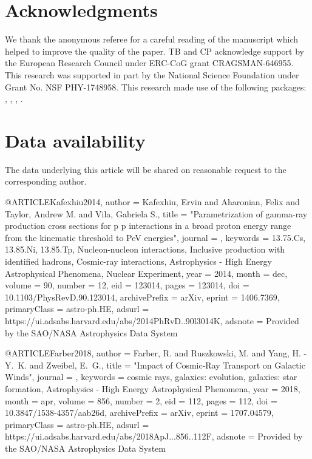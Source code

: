 \documentclass[useAMS,usenatbib]{mnras}
\begin{document}
\section*{Acknowledgments}
We thank the anonymous referee for a careful reading of the manuscript which helped to improve the quality of the paper. TB and CP acknowledge support by the European Research Council under ERC-CoG grant CRAGSMAN-646955. This research was supported in part by the National Science Foundation under Grant No. NSF PHY-1748958. This research made use of the following {} packages: {} \citep{matplotlib}, {} \citep{scipy}, {} \citep{numpy},  {} \citep{ipython,jupyter}.

\section*{Data availability}
The data underlying this article will be shared on reasonable request to the corresponding author.





@ARTICLE{Kafexhiu2014,
       author = {{Kafexhiu}, Ervin and {Aharonian}, Felix and {Taylor}, Andrew M. and
         {Vila}, Gabriela S.},
        title = "{Parametrization of gamma-ray production cross sections for p p interactions in a broad proton energy range from the kinematic threshold to PeV energies}",
      journal = {\prd},
     keywords = {13.75.Cs, 13.85.Ni, 13.85.Tp, Nucleon-nucleon interactions, Inclusive production with identified hadrons, Cosmic-ray interactions, Astrophysics - High Energy Astrophysical Phenomena, Nuclear Experiment},
         year = 2014,
        month = dec,
       volume = {90},
       number = {12},
          eid = {123014},
        pages = {123014},
          doi = {10.1103/PhysRevD.90.123014},
archivePrefix = {arXiv},
       eprint = {1406.7369},
 primaryClass = {astro-ph.HE},
       adsurl = {https://ui.adsabs.harvard.edu/abs/2014PhRvD..90l3014K},
      adsnote = {Provided by the SAO/NASA Astrophysics Data System}
}

@ARTICLE{Farber2018,
       author = {{Farber}, R. and {Ruszkowski}, M. and {Yang}, H. -Y.~K. and
         {Zweibel}, E.~G.},
        title = "{Impact of Cosmic-Ray Transport on Galactic Winds}",
      journal = {\apj},
     keywords = {cosmic rays, galaxies: evolution, galaxies: star formation, Astrophysics - High Energy Astrophysical Phenomena},
         year = 2018,
        month = apr,
       volume = {856},
       number = {2},
          eid = {112},
        pages = {112},
          doi = {10.3847/1538-4357/aab26d},
archivePrefix = {arXiv},
       eprint = {1707.04579},
 primaryClass = {astro-ph.HE},
       adsurl = {https://ui.adsabs.harvard.edu/abs/2018ApJ...856..112F},
      adsnote = {Provided by the SAO/NASA Astrophysics Data System}
}
\end{document}
